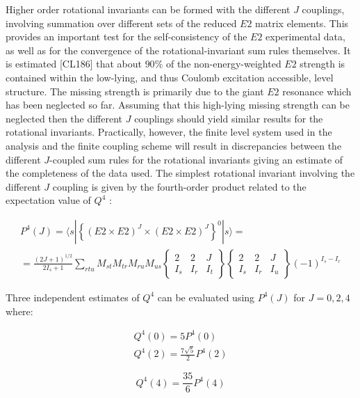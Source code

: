 \documentclass[10pt]{article}
\begin{document}
Higher order rotational invariants can be formed with the different $J$ couplings, involving summation over different sets of the reduced $E 2$ matrix elements. This provides an important test for the self-consistency of the $E 2$ experimental data, as well as for the convergence of the rotational-invariant sum rules themselves. It is estimated [CL186] that about $90 \%$ of the non-energy-weighted $E 2$ strength is contained within the low-lying, and thus Coulomb excitation accessible, level structure. The missing strength is primarily due to the giant $E 2$ resonance which has been neglected so far. Assuming that this high-lying missing strength can be neglected then the different $J$ couplings should yield similar results for the rotational invariants. Practically, however, the finite level system used in the analysis and the finite coupling scheme will result in discrepancies between the different $J$-coupled sum rules for the rotational invariants giving an estimate of the completeness of the data used. The simplest rotational invariant involving the different $J$ coupling is given by the fourth-order product related to the expectation value of $Q^{4}$ :


\begin{gather*}
P^{4}(J)=\langle s|\left\{(E 2 \times E 2)^{J} \times(E 2 \times E 2)^{J}\right\}^{0}|s\rangle=  \tag{9.11}\\
=\frac{(2 J+1)^{1 / 2}}{2 I_{s}+1} \sum_{r t u} M_{s t} M_{t r} M_{r u} M_{u s}\left\{\begin{array}{ccc}
2 & 2 & J \\
I_{s} & I_{r} & I_{t}
\end{array}\right\}\left\{\begin{array}{ccc}
2 & 2 & J \\
I_{s} & I_{r} & I_{u}
\end{array}\right\}(-1)^{I_{s}-I_{r}}
\end{gather*}


Three independent estimates of $Q^{4}$ can be evaluated using $P^{4}(J)$ for $J=0,2,4$ where:


\begin{gather*}
Q^{4}(0)=5 P^{4}(0)  \tag{9.12a}\\
Q^{4}(2)=\frac{7 \sqrt{5}}{2} P^{4}(2) \tag{9.12b}
\end{gather*}



\begin{equation*}
Q^{4}(4)=\frac{35}{6} P^{4}(4) \tag{9.12c}
\end{equation*}
\end{document}
